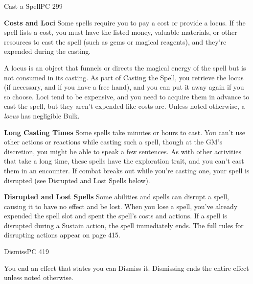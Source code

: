 \documentclass[12pt,openany,twocolumn]{book}
\begin{document}
\begin{action}{Cast a Spell}{}{PC 299}
\begin{actionbody}
        \textbf{Costs and Loci} Some spells require you to pay a cost or provide a locus. If the spell lists a cost, you must have the listed money, valuable materials, or other resources to cast the spell (such as gems or magical reagents), and they're expended during the casting.

        A locus is an object that funnels or directs the magical energy of the spell but is not consumed in its casting. As part of Casting the Spell, you retrieve the locus (if necessary, and if you have a free hand), and you can put it away again if you so choose. Loci tend to be expensive, and you need to acquire them in advance to cast the spell, but they aren't expended like costs are. Unless noted otherwise, a \emph{locus} has negligible Bulk.

        \textbf{Long Casting Times} Some spells take minutes or hours to cast. You can't use other actions or reactions while casting such a spell, though at the GM's discretion, you might be able to speak a few sentences. As with other activities that take a long time, these spells have the exploration trait, and you can't cast them in an encounter. If combat breaks out while you're casting one, your spell is disrupted (see Disrupted and Lost Spells below).

        \textbf{Disrupted and Lost Spells} Some abilities and spells can disrupt a spell, causing it to have no effect and be lost. When you lose a spell, you've already expended the spell slot and spent the spell's costs and actions. If a spell is disrupted during a Sustain action, the spell immediately ends. The full rules for disrupting actions appear on page 415.
    \end{actionbody}
\end{action}
    
\begin{action}{Dismiss}{}{PC 419}
    \begin{actioninfo}
    \end{actioninfo}

    \begin{actionbody}
        You end an effect that states you can Dismiss it. Dismissing ends the entire effect unless noted otherwise.
    \end{actionbody}
\end{action}
\end{document}
